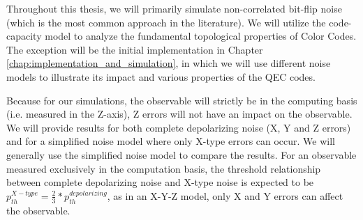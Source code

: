 Throughout this thesis, we will primarily simulate non-correlated bit-flip noise (which is the most common approach in the literature). We will utilize the code-capacity model to analyze the fundamental topological properties of Color Codes. The exception will be the initial implementation in Chapter \ref{chap:implementation_and_simulation}, in which we will use different noise models to illustrate its impact and various properties of the QEC codes. 

Because for our simulations, the observable will strictly be in the computing basis (i.e. measured in the Z-axis), Z errors will not have an impact on the observable. We will provide results for both complete depolarizing noise (X, Y and Z errors) and for a simplified noise model where only X-type errors can occur. We will generally use the simplified noise model to compare the results. For an observable measured exclusively in the computation basis, the threshold relationship between complete depolarizing noise and X-type noise is expected to be $p_{th}^{X-type} = \frac{2}{3} * p_{th}^{depolarizing}$, as in an X-Y-Z model, only X and Y errors can affect the observable.